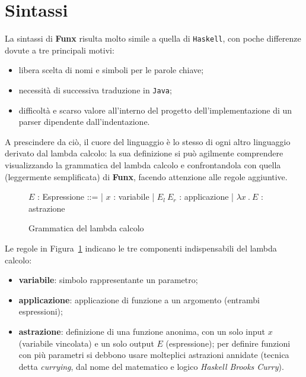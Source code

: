 \section{Sintassi}
\label{sec:2-3-syntax}

La sintassi di \textbf{Funx} risulta molto simile a quella di \texttt{Haskell}, con poche differenze dovute
a tre principali motivi:
\begin{itemize}
    \item libera scelta di nomi e simboli per le parole chiave;
    \item necessità di successiva traduzione in \texttt{Java};
    \item difficoltà e scarso valore all'interno del progetto dell'implementazione di un parser dipendente dall'indentazione.
\end{itemize}

\noindent A prescindere da ciò, il cuore del linguaggio è lo stesso di ogni altro linguaggio derivato dal lambda calcolo:
la sua definizione si può agilmente comprendere visualizzando la grammatica del lambda calcolo e confrontandola con
quella (leggermente semplificata) di \textbf{Funx}, facendo attenzione alle regole aggiuntive.

\begin{figure}
    \vspace{4mm}
    \begin{bnf}
        $E$ : \small{Espressione} ::=
        | $x$ : \small{variabile}
        | $E_l\ E_r$ : \small{applicazione}
        | $\lambda x\ .\ E$ : \small{astrazione}
    \end{bnf}
    \caption{Grammatica del lambda calcolo}
    \label{fig:2-3-lambda-syntax}
    \vspace{4mm}
\end{figure}

\noindent Le regole in Figura~\ref{fig:2-3-lambda-syntax} indicano le tre componenti indispensabili
del lambda calcolo:
\begin{itemize}
    \item \textbf{variabile}: simbolo rappresentante un parametro;
    \item \textbf{applicazione}: applicazione di funzione a un argomento (entrambi espressioni);
    \item \textbf{astrazione}: definizione di una funzione anonima, con un solo input $x$ (variabile vincolata)
          e un solo output $E$ (espressione); per definire funzioni con più
          parametri si debbono usare molteplici astrazioni annidate (tecnica detta \textit{currying},
          dal nome del matematico e logico \textit{Haskell Brooks Curry}).
\end{itemize}

